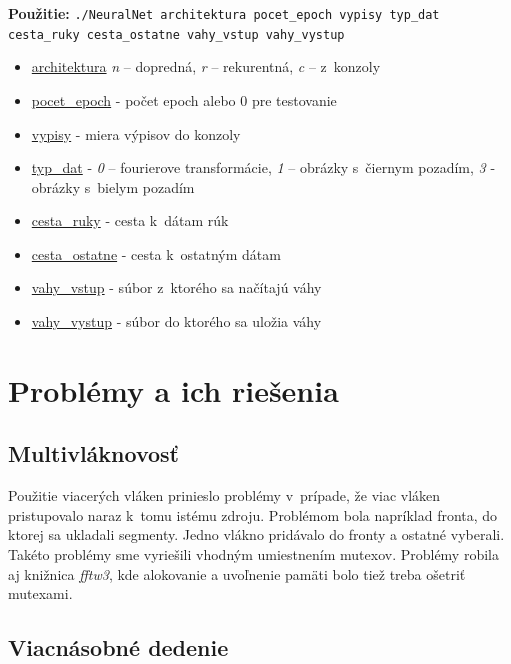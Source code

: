 \textbf{Použitie:} {\tt ./NeuralNet architektura pocet\_epoch vypisy typ\_dat cesta\_ruky cesta\_ostatne vahy\_vstup vahy\_vystup}
\begin{itemize}
\item \underline{architektura} \textit{n} -- dopredná, \textit{r} -- rekurentná, \textit{c} -- z~konzoly
\item \underline{pocet\_epoch} - počet epoch alebo 0 pre testovanie
\item \underline{vypisy} - miera výpisov do konzoly
\item \underline{typ\_dat} - \textit{0} -- fourierove transformácie, \textit{1} -- obrázky s~čiernym pozadím, \textit{3} - obrázky s~bielym pozadím
\item \underline{cesta\_ruky} - cesta k~dátam rúk
\item \underline{cesta\_ostatne} - cesta k~ostatným dátam
\item \underline{vahy\_vstup} - súbor z~ktorého sa načítajú váhy
\item \underline{vahy\_vystup} - súbor do ktorého sa uložia váhy
\end{itemize}


\section{Problémy a ich riešenia}

\subsection{Multivláknovosť}

Použitie viacerých vláken prinieslo problémy v~prípade, že viac vláken pristupovalo naraz k~tomu istému zdroju. Problémom bola napríklad fronta, do ktorej sa ukladali segmenty. Jedno vlákno pridávalo do fronty a ostatné vyberali. Takéto problémy sme vyriešili vhodným umiestnením mutexov. Problémy robila aj knižnica \textit{fftw3}, kde alokovanie a uvoľnenie pamäti bolo tiež treba ošetriť mutexami.

\subsection{Viacnásobné dedenie}

